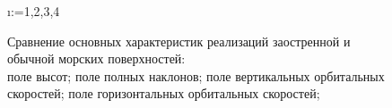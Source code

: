 \begin{figure}[h]
\centering
\makeatletter
    \@for\i:={1,2,3,4}

\label{fig:cwm_modeling}
\caption{
    Сравнение основных характеристик реализаций заостренной и обычной
    морских поверхностей: \\
     поле высот;
     поле полных наклонов;
     поле вертикальных орбитальных скоростей;
     поле горизонтальных орбитальных скоростей;
}
\makeatother
\end{figure}




